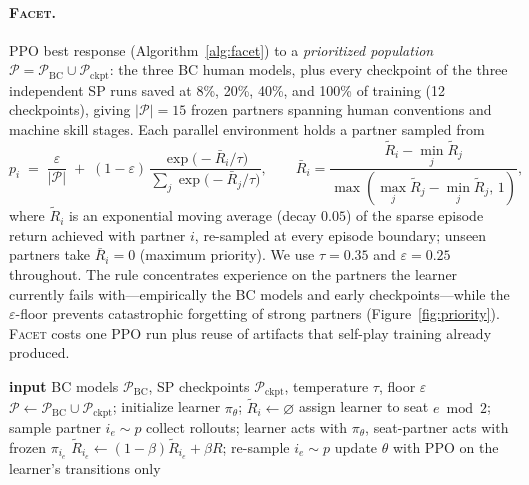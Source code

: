 \documentclass[11pt]{article}
\newcommand{\facet}{\textsc{Facet}}
\begin{document}
\paragraph{\facet{}.}
PPO best response (Algorithm~\ref{alg:facet}) to a \emph{prioritized
population}
$\mathcal{P}=\mathcal{P}_{\mathrm{BC}}\cup\mathcal{P}_{\mathrm{ckpt}}$:
the three BC human models, plus every checkpoint of the three independent SP
runs saved at 8\%, 20\%, 40\%, and 100\% of training (12 checkpoints),
giving $|\mathcal{P}|=15$ frozen partners spanning human conventions and
machine skill stages. Each parallel environment holds a partner sampled from
\begin{equation}
\label{eq:priority}
p_i \;=\; \frac{\varepsilon}{|\mathcal{P}|}
\;+\;(1-\varepsilon)\,
\frac{\exp\!\big(-\bar{R}_i/\tau\big)}
     {\sum_{j}\exp\!\big(-\bar{R}_j/\tau\big)},
\qquad
\bar{R}_i=\frac{\tilde{R}_i-\min_j \tilde{R}_j}
               {\max(\max_j \tilde{R}_j-\min_j \tilde{R}_j,\,1)},
\end{equation}
where $\tilde{R}_i$ is an exponential moving average (decay $0.05$) of the
sparse episode return achieved with partner $i$, re-sampled at every episode
boundary; unseen partners take $\bar{R}_i=0$ (maximum priority). We use
$\tau=0.35$ and $\varepsilon=0.25$ throughout. The rule concentrates
experience on the partners the learner currently fails with---empirically
the BC models and early checkpoints---while the $\varepsilon$-floor
prevents catastrophic forgetting of strong partners
(Figure~\ref{fig:priority}). \facet{} costs one PPO run plus reuse of
artifacts that self-play training already produced.

\begin{algorithm}[t]
\caption{\facet{} training}
\label{alg:facet}
\begin{algorithmic}[1]
\State \textbf{input} BC models $\mathcal{P}_{\mathrm{BC}}$, SP checkpoints
$\mathcal{P}_{\mathrm{ckpt}}$, temperature $\tau$, floor $\varepsilon$
\State $\mathcal{P}\gets\mathcal{P}_{\mathrm{BC}}\cup\mathcal{P}_{\mathrm{ckpt}}$;\;
initialize learner $\pi_\theta$;\; $\tilde{R}_i\gets\varnothing$
  \State assign learner to seat $e \bmod 2$; sample partner
  $i_e\sim p$ 
\EndFor
{}
  \State collect rollouts; learner acts with $\pi_\theta$, seat-partner
  acts with frozen $\pi_{i_e}$
    \State $\tilde{R}_{i_e}\gets(1-\beta)\tilde{R}_{i_e}+\beta R$;\quad
    re-sample $i_e\sim p$
  \EndFor
  \State update $\theta$ with PPO on the learner's transitions only
\EndWhile
\end{algorithmic}
\end{algorithm}
\end{document}
